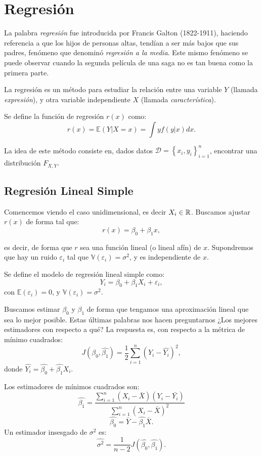 \section{Regresión}

La palabra \emph{regresión} fue introducida por Francis Galton (1822-1911), haciendo referencia a que los hijos de personas altas, tendían a ser más bajos que sus padres,  fenómeno que denominó \textit{regresión a la media}. Este mismo fenómeno se puede observar cuando la segunda película de una saga no es tan buena como la primera parte. 

La regresión es un método para estudiar la relación entre una variable $Y$ (llamada \emph{expresión}), y otra variable independiente $X$ (llamada \emph{característica}). 
\begin{definition} Se define la función de regresión $r(x)$ como:
$$
r(x)=\mathbb{E}(Y|X=x)=\int yf(y|x)dx.
$$

\end{definition}
La idea de este método consiste en, dados datos $\mathcal{D}=\left \{ x_i,y_i \right \}_{i=1}^{n}$, encontrar una distribución $F_{X,Y}$. 


\subsection{Regresión Lineal Simple}

Comencemos viendo el caso unidimensional, es decir $X_i \in {\mathbb R}$. Buscamos ajustar $r(x)$ de forma tal que: 
$$
r(x)=\beta_0 + \beta_1 x,
$$

 es decir, de forma que $r$ sea una función lineal (o lineal afín) de $x$. 
Supondremos que hay un ruido $\varepsilon_i$ tal que $\mathbb{V}(\varepsilon_i)=\sigma^2$, y es independiente de $x$. \\
\begin{definition}
Se define el modelo de regresión lineal simple como: 
$$
Y_i=\beta_0+\beta_1 X_i+ \varepsilon_i,
$$
con $\mathbb{E}(\varepsilon_i)=0$, y $\mathbb{V}(\varepsilon_i)=\sigma^2$.
\end{definition}
Buscamos estimar $\beta_0$ y $\beta_1$ de forma que tengamos una aproximación lineal que sea lo mejor posible. Estas últimas palabras nos hacen preguntarnos ¿Los mejores estimadores con respecto a qué? La respuesta es, con respecto a la métrica de mínimo cuadrados: 
$$
J(\hat{\beta_0},\hat{\beta_1})=\dfrac{1}{2} \sum_{i=1}^{n}(Y_i-\hat{Y_i})^{2},
$$
donde $\hat{Y_i}=\hat{\beta_0}+\hat{\beta_1}X_i$. 
\begin{theorem}
Los estimadores de mínimos cuadrados son: 
$$
\hat{\beta_1}=\dfrac{\sum_{i=1}^{n}(X_i-\bar{X})(Y_i-\bar{Y_i})}{\sum_{i=1}^{n}(X_i-\bar{X})^{2}}
$$
$$
\hat{\beta_0}=\bar{Y}-\hat{\beta_1}\bar{X}.
$$
Un estimador insesgado de $\sigma^2$ es:
$$
\hat{\sigma^2}=\dfrac{1}{n-2} J(\hat{\beta_0},\hat{\beta_1}).
$$
\end{theorem}


